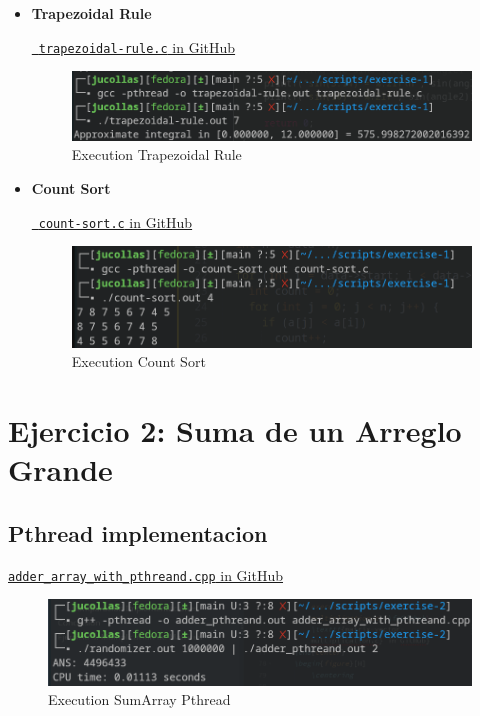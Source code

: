 \documentclass[12pt]{article}
\begin{document}
\begin{itemize}
    \item \textbf{Trapezoidal Rule}
    \begin{center}
        \href{https://github.com/jucollas/parallel-programming/blob/main/practical-session-2/scripts/exercise-1/trapezoidal-rule.c}{\faGithub\ \texttt{trapezoidal-rule.c} in GitHub}
    \end{center}
    \begin{figure}[H]
        \centering
        \includegraphics[width=0.8\linewidth]{images/execution-trapezoidal-rule.png}
        \caption{Execution Trapezoidal Rule}
        \label{fig:os}
    \end{figure}

    \item \textbf{Count Sort}
    \begin{center}
        \href{https://github.com/jucollas/parallel-programming/blob/main/practical-session-2/scripts/exercise-1/count-sort.c}{\faGithub\ \texttt{count-sort.c} in GitHub}
    \end{center}
    \begin{figure}[H]
        \centering
        \includegraphics[width=0.8\linewidth]{images/execution-count-sort.png}
        \caption{Execution Count Sort}
        \label{fig:os}
    \end{figure}
\end{itemize}

\section*{Ejercicio 2: Suma de un Arreglo Grande}

\subsection*{Pthread implementacion}

\begin{center}
    \href{https://github.com/jucollas/parallel-programming/blob/main/practical-session-2/scripts/exercise-2/adder_array_with_pthreand.cpp}{\faGithub \texttt{adder\_array\_with\_pthreand.cpp} in GitHub}
\end{center}
\begin{figure}[H]
    \centering
    \includegraphics[width=0.8\linewidth]{images/execution-sum-array-pthread.png}
    \caption{Execution SumArray Pthread}
    \label{fig:os}
\end{figure}
\end{document}
